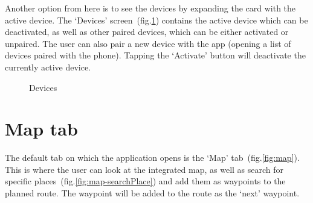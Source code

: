 Another option from here is to see the devices by expanding the card with the active device.
The `Devices' screen~(fig.\ref{fig:devices}) contains the active device which can be deactivated, as well as other paired devices, which can be either activated or unpaired.
The user can also pair a new device with the app (opening a list of devices paired with the phone).
Tapping the `Activate' button will deactivate the currently active device.

\begin{figure}[h!]
    \centering
    \hfill
    \caption{Devices}
    \label{fig:devices}
\end{figure}

\section{Map tab}
The default tab on which the application opens is the `Map' tab~(fig.\ref{fig:map}).
This is where the user can look at the integrated map, as well as search for specific places~(fig.\ref{fig:map-searchPlace}) and add them as waypoints to the planned route.
The waypoint will be added to the route as the `next' waypoint.

